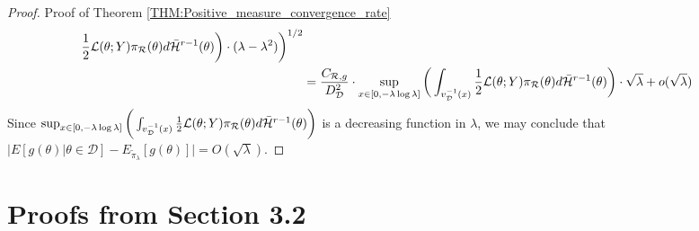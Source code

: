 \documentclass[10pt,fleqn]{article} \pdfoutput=1
\DeclareMathOperator{\1}{\mathbbm{1}} \DeclareMathOperator{\bigO}{\mc O}
\begin{document}
\begin{proof}{Proof of Theorem \ref{THM:Positive_measure_convergence_rate}}
\begin{align*}
		\frac{1}{2}\mathcal{L}(\theta;Y) \pi_\mathcal{R}(\theta)
		d\bar{\mathcal{H}}^{r-1}(\theta)\bigg)  \cdot (\lambda - \lambda^2)
		\bigg)^{1/2}                                                              \\ &= \frac{C_{\mathcal{R},g}}{D_\mathcal{D}^2} \cdot \sup_{x
			\in [0,-\lambda\log\lambda]} \bigg( \int_{v_{\mathcal{D}}^{-1}(x)}
		\frac{1}{2}\mathcal{L}(\theta;Y) \pi_\mathcal{R}(\theta)
		d\bar{\mathcal{H}}^{r-1}(\theta)\bigg)  \cdot \sqrt{\lambda} +
		o(\sqrt{\lambda})\end{align*} Since $\sup_{x \in [0,-\lambda\log\lambda]}
		\bigg( \int_{v_{\mathcal{D}}^{-1}(x)} \frac{1}{2}\mathcal{L}(\theta;Y)
		\pi_\mathcal{R}(\theta) d\bar{\mathcal{H}}^{r-1}(\theta)\bigg)$ is a
	decreasing function in $\lambda$, we may conclude that $\big|
		E[g(\theta)|\theta\in\mathcal{D}]-E_{\tilde{\pi}_\lambda}[g(\theta)]\big| =
		O(\sqrt{\lambda}).$ \end{proof}

\section{Proofs from Section 3.2}
\end{document}
